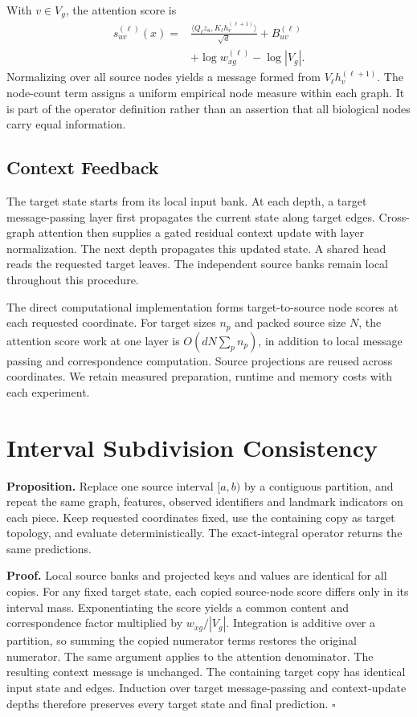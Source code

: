 \documentclass[letterpaper]{article}
\begin{document}
With $v\in V_g$, the attention score is
\begin{align}
 s_{uv}^{(\ell)}(x)={}&
 \frac{\langle Q_\ell z_u,K_\ell h_v^{(\ell+1)}\rangle}{\sqrt d}
 +B_{uv}^{(\ell)}\nonumber\\
 &+\log w_{xg}^{(\ell)}-\log |V_g|.
\end{align}
Normalizing over all source nodes yields a message formed from $V_\ell h_v^{(\ell+1)}$. The node-count term assigns a uniform empirical node measure within each graph. It is part of the operator definition rather than an assertion that all biological nodes carry equal information.

\subsection{Context Feedback}
The target state starts from its local input bank. At each depth, a target message-passing layer first propagates the current state along target edges. Cross-graph attention then supplies a gated residual context update with layer normalization. The next depth propagates this updated state. A shared head reads the requested target leaves. The independent source banks remain local throughout this procedure.

The direct computational implementation forms target-to-source node scores at each requested coordinate. For target sizes $n_p$ and packed source size $N$, the attention score work at one layer is $O(dN\sum_p n_p)$, in addition to local message passing and correspondence computation. Source projections are reused across coordinates. We retain measured preparation, runtime and memory costs with each experiment.

\section{Interval Subdivision Consistency}
\textbf{Proposition.} Replace one source interval $[a,b)$ by a contiguous partition, and repeat the same graph, features, observed identifiers and landmark indicators on each piece. Keep requested coordinates fixed, use the containing copy as target topology, and evaluate deterministically. The exact-integral operator returns the same predictions.

\textbf{Proof.} Local source banks and projected keys and values are identical for all copies. For any fixed target state, each copied source-node score differs only in its interval mass. Exponentiating the score yields a common content and correspondence factor multiplied by $w_{xg}/|V_g|$. Integration is additive over a partition, so summing the copied numerator terms restores the original numerator. The same argument applies to the attention denominator. The resulting context message is unchanged. The containing target copy has identical input state and edges. Induction over target message-passing and context-update depths therefore preserves every target state and final prediction. $\square$
\end{document}
